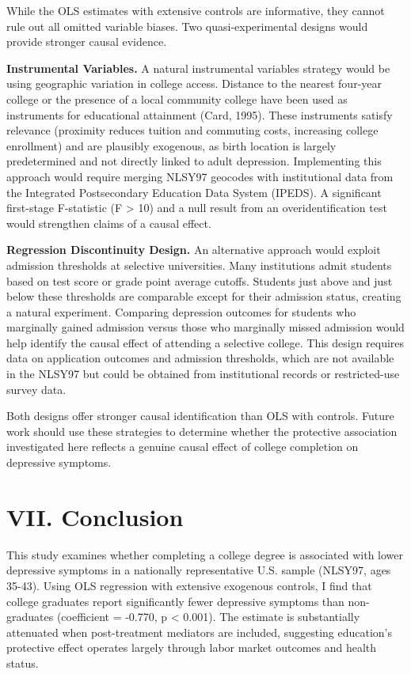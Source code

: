 \documentclass[
  12pt,
]{article}
\begin{document}
While the OLS estimates with extensive controls are informative, they
cannot rule out all omitted variable biases. Two quasi-experimental
designs would provide stronger causal evidence.

\textbf{Instrumental Variables.} A natural instrumental variables
strategy would be using geographic variation in college access. Distance
to the nearest four-year college or the presence of a local community
college have been used as instruments for educational attainment (Card,
1995). These instruments satisfy relevance (proximity reduces tuition
and commuting costs, increasing college enrollment) and are plausibly
exogenous, as birth location is largely predetermined and not directly
linked to adult depression. Implementing this approach would require
merging NLSY97 geocodes with institutional data from the Integrated
Postsecondary Education Data System (IPEDS). A significant first-stage
F-statistic (F \textgreater{} 10) and a null result from an
overidentification test would strengthen claims of a causal effect.

\textbf{Regression Discontinuity Design.} An alternative approach would
exploit admission thresholds at selective universities. Many
institutions admit students based on test score or grade point average
cutoffs. Students just above and just below these thresholds are
comparable except for their admission status, creating a natural
experiment. Comparing depression outcomes for students who marginally
gained admission versus those who marginally missed admission would help
identify the causal effect of attending a selective college. This design
requires data on application outcomes and admission thresholds, which
are not available in the NLSY97 but could be obtained from institutional
records or restricted-use survey data.

Both designs offer stronger causal identification than OLS with
controls. Future work should use these strategies to determine whether
the protective association investigated here reflects a genuine causal
effect of college completion on depressive symptoms.

\section{VII. Conclusion}\label{vii.-conclusion}

This study examines whether completing a college degree is associated
with lower depressive symptoms in a nationally representative U.S.
sample (NLSY97, ages 35-43). Using OLS regression with extensive
exogenous controls, I find that college graduates report significantly
fewer depressive symptoms than non-graduates (coefficient = -0.770, p
\textless{} 0.001). The estimate is substantially attenuated when
post-treatment mediators are included, suggesting education's protective
effect operates largely through labor market outcomes and health status.
\end{document}
